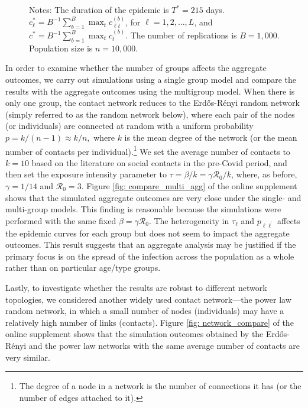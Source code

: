 \documentclass[12pt]{article}
\begin{document}
\begin{figure}[!hp]
\begin{center}
\end{center}

%

\vspace{-0.2cm}%
Notes: The duration of the epidemic is $T^{\ast}=215$ days$.$ $c_{\ell}^{\ast
}=B^{-1}\sum_{b=1}^{B}\max_{t}c_{\ell t}^{(b)}$, for $\ell=1,2,\ldots,L$, and
$c^{\ast}=B^{-1}\sum_{b=1}^{B}\max_{t}c_{t}^{(b)}.$ The number of replications
is $B=1,000$. Population size is $n=10,000$.%

\end{figure}%


In order to examine whether the number of groups affects the aggregate
outcomes, we carry out simulations using a single group model and compare the
results with the aggregate outcomes using the multigroup model. When there is
only one group, the contact network reduces to the Erd\H{o}s-R\'{e}nyi random
network (simply referred to as the random network below), where each pair of
the nodes (or individuals) are connected at random with a uniform probability
$p=k/\left(  n-1\right)  \approx k/n,$ where $k$ is the mean degree of the
network (or the mean number of contacts per individual).\footnote{The degree
of a node in a network is the number of connections it has (or the number of
edges attached to it).} We set the average number of contacts to $k=10$ based
on the literature on social contacts in the pre-Covid period, and then set the
exposure intensity parameter to $\tau=\beta/k=\gamma\mathcal{R}_{0}/k$, where,
as before, $\gamma=1/14$ and $\mathcal{R}_{0}=3$. Figure
\ref{fig: compare_multi_agg} of the online supplement shows that the simulated
aggregate outcomes are very close under the single- and multi-group models.
This finding is reasonable because the simulations were performed with the
same fixed $\beta=\gamma\mathcal{R}_{0}$. The heterogeneity in $\tau_{\ell}$
and $p_{\ell\ell^{^{\prime}}}$ affects the epidemic curves for each group but
does not seem to impact the aggregate outcomes. This result suggests that an
aggregate analysis may be justified if the primary focus is on the spread of
the infection across the population as a whole rather than on particular
age/type groups.

Lastly, to investigate whether the results are robust to different network
topologies, we considered another widely used contact network---the power law
random network, in which a small number of nodes (individuals) may have a
relatively high number of links (contacts). Figure \ref{fig: network_compare}
of the online supplement shows that the simulation outcomes obtained by the
Erd\H{o}s-R\'{e}nyi and the power law networks with the same average number of
contacts are very similar.
\end{document}
